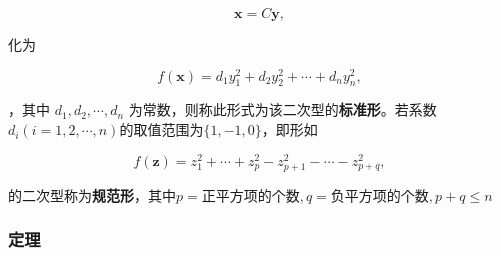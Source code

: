 \documentclass[./linear_algebra.tex]{subfiles}
\begin{document}
    \[
        \boldsymbol{x}=C\boldsymbol{y},
    \]

    \noindent
    化为

    \[
        f(\boldsymbol{x}) = d_1y_1^2+d_2y_2^2+\cdots+d_ny_n^2,
    \]

    \noindent
    {\color{red}{只含平方项，不含交叉项}}，其中 $d_1,d_2,\cdots,d_n$ 为常数，则称此形式为该二次型的\textbf{标准形}。若系数$d_i(i = 1, 2, \cdots, n)$的取值范围为$\{1, -1, 0\}$，即形如

    \[
        f(\boldsymbol{z}) = z_1^2+\cdots+z_p^2 - z_{p+1}^2-\cdots-z_{p+q}^2,
    \]

    \noindent
    的二次型称为\textbf{规范形}，其中$p=\text{正平方项的个数}, q=\text{负平方项的个数}, p+q\leq n $

    \subsubsection{定理}
\end{document}
